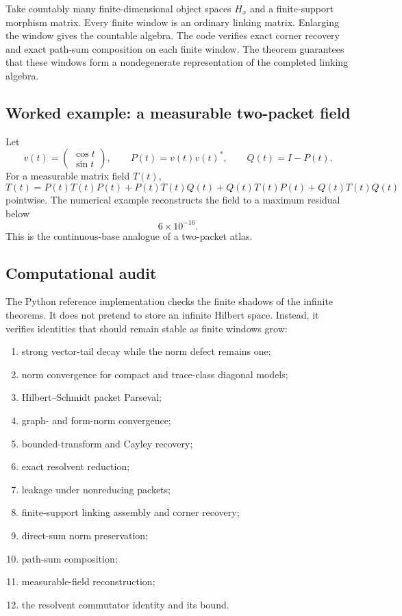 \documentclass[11pt]{article}
\theoremstyle{definition}
\theoremstyle{remark}
\begin{document}
Take countably many finite-dimensional object spaces $H_x$ and a finite-support morphism matrix.  Every finite window is an ordinary linking matrix.  Enlarging the window gives the countable algebra.  The code verifies exact corner recovery and exact path-sum composition on each finite window.  The theorem guarantees that these windows form a nondegenerate representation of the completed linking algebra.

\subsection{Worked example: a measurable two-packet field}

Let
\[
v(t)=\begin{pmatrix}\cos t\\ \sin t\end{pmatrix},
\qquad
P(t)=v(t)v(t)^*,
\qquad
Q(t)=I-P(t).
\]
For a measurable matrix field $T(t)$,
\[
T(t)=P(t)T(t)P(t)+P(t)T(t)Q(t)+Q(t)T(t)P(t)+Q(t)T(t)Q(t)
\]
pointwise.  The numerical example reconstructs the field to a maximum residual below
\[
6\times10^{-16}.
\]
This is the continuous-base analogue of a two-packet atlas.

\subsection{Computational audit}

The Python reference implementation checks the finite shadows of the infinite theorems.  It does not pretend to store an infinite Hilbert space.  Instead, it verifies identities that should remain stable as finite windows grow:
\begin{enumerate}[label=\arabic*.]
\item strong vector-tail decay while the norm defect remains one;
\item norm convergence for compact and trace-class diagonal models;
\item Hilbert--Schmidt packet Parseval;
\item graph- and form-norm convergence;
\item bounded-transform and Cayley recovery;
\item exact resolvent reduction;
\item leakage under nonreducing packets;
\item finite-support linking assembly and corner recovery;
\item direct-sum norm preservation;
\item path-sum composition;
\item measurable-field reconstruction;
\item the resolvent commutator identity and its bound.
\end{enumerate}
\end{document}
